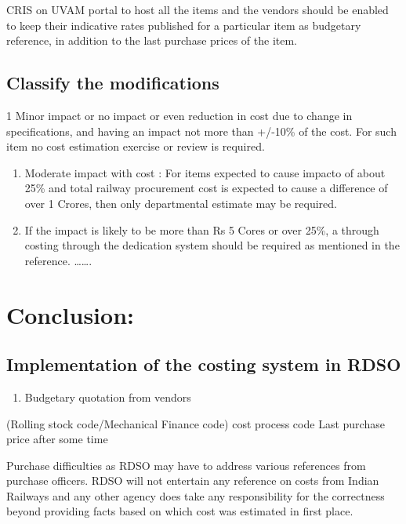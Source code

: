 \documentclass[
  10pt,
  twoside]{article}
\providecommand{\tightlist}{%
  \setlength{\itemsep}{0pt}\setlength{\parskip}{0pt}}
\begin{document}
CRIS on UVAM portal to host all the items and the vendors should be
enabled to keep their indicative rates published for a particular item
as budgetary reference, in addition to the last purchase prices of the
item.

\hypertarget{classify-the-modifications}{%
\subsection{Classify the
modifications}\label{classify-the-modifications}}

1 Minor impact or no impact or even reduction in cost due to change in
specifications, and having an impact not more than +/-10\% of the cost.
For such item no cost estimation exercise or review is required.

\begin{enumerate}
\def\labelenumi{\arabic{enumi}.}
\setcounter{enumi}{1}
\item
  Moderate impact with cost : For items expected to cause impacto of
  about 25\% and total railway procurement cost is expected to cause a
  difference of over 1 Crores, then only departmental estimate may be
  required.
\item
  If the impact is likely to be more than Rs 5 Cores or over 25\%, a
  through costing through the dedication system should be required as
  mentioned in the reference. \ldots\ldots.
\end{enumerate}

\hypertarget{conclusion}{%
\section{Conclusion:}\label{conclusion}}

\hypertarget{implementation-of-the-costing-system-in-rdso}{%
\subsection{Implementation of the costing system in
RDSO}\label{implementation-of-the-costing-system-in-rdso}}

\begin{enumerate}
\def\labelenumi{\arabic{enumi}.}
\tightlist
\item
  Budgetary quotation from vendors
\end{enumerate}

(Rolling stock code/Mechanical Finance code) cost process code Last
purchase price after some time

Purchase difficulties as RDSO may have to address various references
from purchase officers. RDSO will not entertain any reference on costs
from Indian Railways and any other agency does take any responsibility
for the correctness beyond providing facts based on which cost was
estimated in first place.
\end{document}

